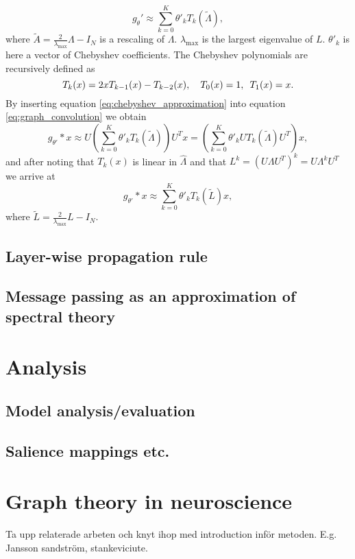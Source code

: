 \begin{equation}
    g_\theta' \approx \sum_{k=0}^K \theta'_k T_k(\tilde{\Lambda}),
    \label{eq:chebyshev_approximation}
\end{equation}
where $\tilde{A} = \frac{2}{\lambda_{\text{max}}}\Lambda - I_N$ is a rescaling of $\Lambda$. $\lambda_{\text{max}}$ is the largest eigenvalue of $L$. $\theta'_k$ is here a vector of Chebyshev coefficients. The Chebyshev polynomials are recursively defined as 
\begin{equation}
    T_k(x) = 2xT_{k-1}(x) - T_{k-2}(x), \hspace{10px} T_0(x) = 1, \hspace{5px} T_1(x) = x.
\end{equation}
By inserting equation \eqref{eq:chebyshev_approximation} into equation \eqref{eq:graph_convolution} we obtain 
\begin{equation}
    g_{\theta'} * x \approx U \left(\sum_{k=0}^K \theta'_k T_k(\tilde{\Lambda})\right)U^Tx = \left(\sum_{k=0}^K \theta'_k U T_k(\tilde{\Lambda}) U^T\right)x,
\end{equation}
and after noting that $T_k(x)$ is linear in $\hat{\Lambda}$ and that $L^k = \left( U \Lambda U^T \right)^k = U \Lambda^k U^T$ we arrive at 
\begin{equation}
    g_{\theta'} * x \approx \sum_{k=0}^K \theta'_k T_k(\tilde{L})x,
\end{equation}
where $\tilde{L} =  \frac{2}{\lambda_{\text{max}}}L - I_N$.




\subsection{Layer-wise propagation rule}


\subsection{Message passing as an approximation of spectral theory}




\section{Analysis}
\subsection{Model analysis/evaluation}
\subsection{Salience mappings etc.}

\section{Graph theory in neuroscience}
Ta upp relaterade arbeten och knyt ihop med introduction inför metoden. E.g. Jansson sandström, stankeviciute.

